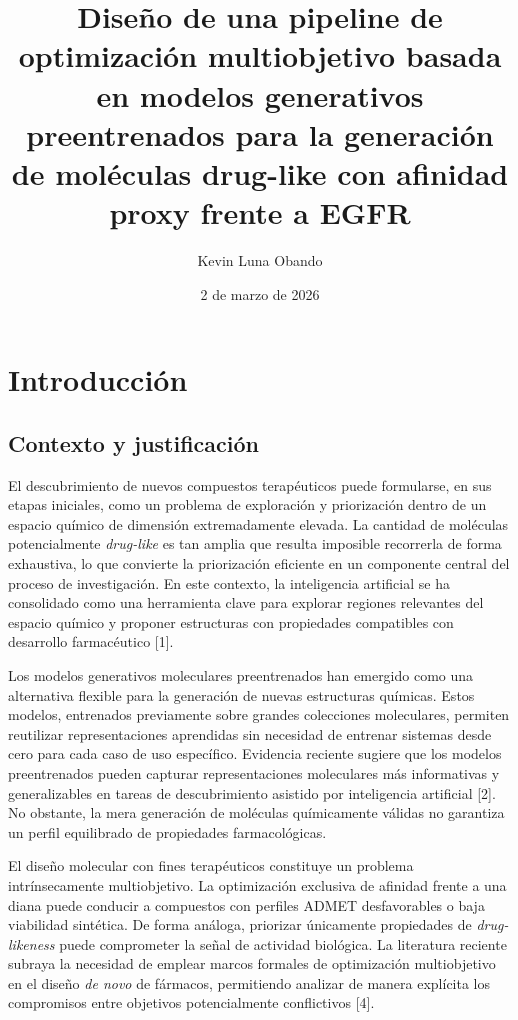 \documentclass[IB]{TFUOC}%
\title{Diseño de una pipeline de optimización multiobjetivo basada en modelos generativos preentrenados para la generación de moléculas drug-like con afinidad proxy frente a EGFR}
\author{Kevin Luna Obando}
\date{2 de marzo de 2026}
\begin{document}
\estructura

\tableofcontents

\listoffigures

\listoftables


\chapter{Introducción}

\section{Contexto y justificación}

El descubrimiento de nuevos compuestos terapéuticos puede formularse, en sus etapas iniciales,
como un problema de exploración y priorización dentro de un espacio químico de dimensión
extremadamente elevada. La cantidad de moléculas potencialmente \textit{drug-like} es tan amplia
que resulta imposible recorrerla de forma exhaustiva, lo que convierte la priorización eficiente
en un componente central del proceso de investigación. En este contexto, la inteligencia artificial
se ha consolidado como una herramienta clave para explorar regiones relevantes del espacio químico
y proponer estructuras con propiedades compatibles con desarrollo farmacéutico [1].

Los modelos generativos moleculares preentrenados han emergido como una alternativa flexible
para la generación de nuevas estructuras químicas. Estos modelos, entrenados previamente sobre
grandes colecciones moleculares, permiten reutilizar representaciones aprendidas sin necesidad de
entrenar sistemas desde cero para cada caso de uso específico. Evidencia reciente sugiere que los
modelos preentrenados pueden capturar representaciones moleculares más informativas y
generalizables en tareas de descubrimiento asistido por inteligencia artificial [2]. No obstante,
la mera generación de moléculas químicamente válidas no garantiza un perfil equilibrado de
propiedades farmacológicas.

El diseño molecular con fines terapéuticos constituye un problema intrínsecamente multiobjetivo.
La optimización exclusiva de afinidad frente a una diana puede conducir a compuestos con perfiles
ADMET desfavorables o baja viabilidad sintética. De forma análoga, priorizar únicamente propiedades
de \textit{drug-likeness} puede comprometer la señal de actividad biológica. La literatura reciente
subraya la necesidad de emplear marcos formales de optimización multiobjetivo en el diseño
\textit{de novo} de fármacos, permitiendo analizar de manera explícita los compromisos entre
objetivos potencialmente conflictivos [4].
\end{document}
